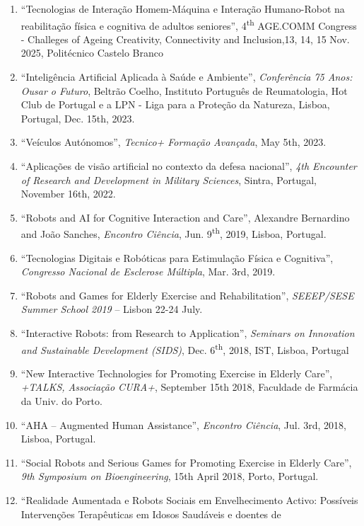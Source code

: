 \begin{enumerate}
\def\labelenumi{\arabic{enumi}.}
\item
  ``Tecnologias de Interação Homem-Máquina e Interação Humano-Robot na
  reabilitação física e cognitiva de adultos seniores'',
  4\textsuperscript{th} AGE.COMM Congress - Challeges of Ageing
  Creativity, Connectivity and Inclusion,13, 14, 15 Nov. 2025,
  Politécnico Castelo Branco
\item
  ``Inteligência Artificial Aplicada à Saúde e Ambiente'',
  \emph{Conferência 75 Anos: Ousar o Futuro}, Beltrão Coelho, Instituto
  Português de Reumatologia, Hot Club de Portugal e a LPN - Liga para a
  Proteção da Natureza, Lisboa, Portugal, Dec. 15th, 2023.
\item
  ``Veículos Autónomos'', \emph{Tecnico+ Formação Avançada}, May 5th,
  2023.
\item
  ``Aplicações de visão artificial no contexto da defesa nacional'',
  \emph{4th Encounter of Research and Development in Military Sciences},
  Sintra, Portugal, November 16th, 2022.
\item
  ``Robots and AI for Cognitive Interaction and Care'', Alexandre
  Bernardino and João Sanches, \emph{Encontro Ciência}, Jun.
  9\textsuperscript{th}, 2019, Lisboa, Portugal.
\item
  ``Tecnologias Digitais e Robóticas para Estimulação Física e
  Cognitiva'', \emph{Congresso Nacional de Esclerose Múltipla}, Mar.
  3rd, 2019.
\item
  ``Robots and Games for Elderly Exercise and Rehabilitation'',
  \emph{SEEEP/SESE Summer School 2019} -- Lisbon 22-24 July.
\item
  ``Interactive Robots: from Research to Application'', \emph{Seminars
  on Innovation and Sustainable Development (SIDS)}, Dec.
  6\textsuperscript{th}, 2018, IST, Lisboa, Portugal
\item
  ``New Interactive Technologies for Promoting Exercise in Elderly
  Care'', \emph{+TALKS, Associação CURA+}, September 15th 2018,
  Faculdade de Farmácia da Univ. do Porto.
\item
  ``AHA -- Augmented Human Assistance'', \emph{Encontro Ciência}, Jul.
  3rd, 2018, Lisboa, Portugal.
\item
  ``Social Robots and Serious Games for Promoting Exercise in Elderly
  Care'', \emph{9th Symposium on Bioengineering}, 15th April 2018,
  Porto, Portugal.
\item
  ``Realidade Aumentada e Robots Sociais em Envelhecimento Activo:
  Possíveis Intervenções Terapêuticas em Idosos Saudáveis e doentes de

\end{enumerate}
